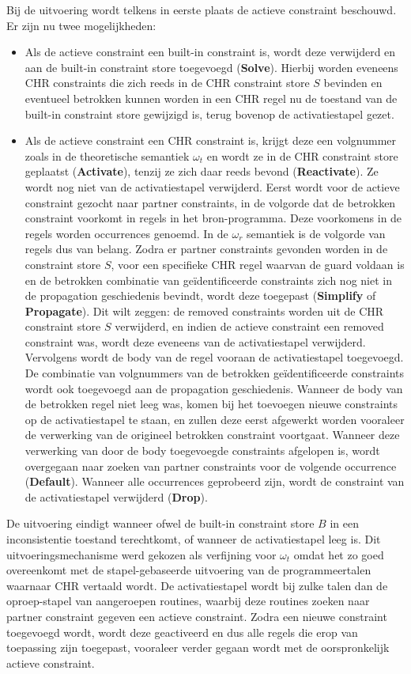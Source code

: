 Bij de uitvoering wordt telkens in eerste plaats de actieve constraint beschouwd. Er zijn nu twee mogelijkheden: \begin{itemize}
\item Als de actieve constraint een built-in constraint is, wordt deze verwijderd en aan de built-in constraint store toegevoegd ({\bf Solve}). Hierbij worden eveneens CHR constraints die zich reeds in de CHR constraint store $S$ bevinden en eventueel betrokken kunnen worden in een CHR regel nu de toestand van de built-in constraint store gewijzigd is, terug bovenop de activatiestapel gezet.
\item Als de actieve constraint een CHR constraint is, krijgt deze een volgnummer zoals in de theoretische semantiek $\omega_t$ en wordt ze in de CHR constraint store geplaatst ({\bf Activate}), tenzij ze zich daar reeds bevond ({\bf Reactivate}). Ze wordt nog niet van de activatiestapel verwijderd. Eerst wordt voor de actieve constraint gezocht naar partner constraints, in de volgorde dat de betrokken constraint voorkomt in regels in het bron-programma. Deze voorkomens in de regels worden occurrences genoemd. In de $\omega_r$ semantiek is de volgorde van regels dus van belang. Zodra er partner constraints gevonden worden in de constraint store $S$, voor een specifieke CHR regel waarvan de guard voldaan is en de betrokken combinatie van ge\"identificeerde constraints zich nog niet in de propagation geschiedenis bevindt, wordt deze toegepast ({\bf Simplify} of {\bf Propagate}). Dit wilt zeggen: de removed constraints worden uit de CHR constraint store $S$ verwijderd, en indien de actieve constraint een removed constraint was, wordt deze eveneens van de activatiestapel verwijderd. Vervolgens wordt de body van de regel vooraan de activatiestapel toegevoegd. De combinatie van volgnummers van de betrokken ge\"identificeerde constraints wordt ook toegevoegd aan de propagation geschiedenis. Wanneer de body van de betrokken regel niet leeg was, komen bij het toevoegen nieuwe constraints op de activatiestapel te staan, en zullen deze eerst afgewerkt worden vooraleer de verwerking van de origineel betrokken constraint voortgaat. Wanneer deze verwerking van door de body toegevoegde constraints afgelopen is, wordt overgegaan naar zoeken van partner constraints voor de volgende occurrence ({\bf Default}). Wanneer alle occurrences geprobeerd zijn, wordt de constraint van de activatiestapel verwijderd ({\bf Drop}).
\end{itemize}
De uitvoering eindigt wanneer ofwel de built-in constraint store $B$ in een inconsistentie toestand terechtkomt, of wanneer de activatiestapel leeg is. Dit uitvoeringsmechanisme werd gekozen als verfijning voor $\omega_t$ omdat het zo goed overeenkomt met de stapel-gebaseerde uitvoering van de programmeertalen waarnaar CHR vertaald wordt. De activatiestapel wordt bij zulke talen dan de oproep-stapel van aangeroepen routines, waarbij deze routines zoeken naar partner constraint gegeven een actieve constraint. Zodra een nieuwe constraint toegevoegd wordt, wordt deze geactiveerd en dus alle regels die erop van toepassing zijn toegepast, vooraleer verder gegaan wordt met de oorspronkelijk actieve constraint.

